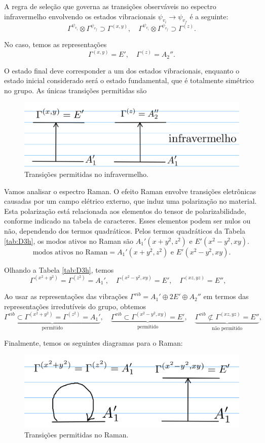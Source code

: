 \documentclass[a4paper,10pt]{article}
\begin{document}
A regra de seleção que governa as transições observáveis no espectro infravermelho envolvendo os estados vibracionais $\psi_{v_i} \to \psi_{v_f}$ é a seguinte:
$$
\Gamma^{\psi_{v_i}} \otimes \Gamma^{\psi_{v_f}} \supset \Gamma^{(x,y)}, \quad
\Gamma^{\psi_{v_i}} \otimes \Gamma^{\psi_{v_f}} \supset \Gamma^{(z)}.
$$

No caso, temos as representações
$$
\Gamma^{(x,y)} = E', \quad \Gamma^{(z)} = A_2''.
$$

O estado final deve corresponder a um dos estados vibracionais, enquanto o estado inicial considerado será o estado fundamental, que é totalmente simétrico no grupo. As únicas transições permitidas são
\begin{figure}[H]
\centering
\includegraphics[height=0.15\linewidth]{fig/infravermelho_my.png}
\caption{Transições permitidas no infravermelho.}
\label{fig:infravermelho}
\end{figure}

Vamos analisar o espectro Raman. O efeito Raman envolve transições eletrônicas causadas por um campo elétrico externo, que induz uma polarização no material. Esta polarização está relacionada aos elementos do tensor de polarizabilidade, conforme indicado na tabela de caracteres. Esses elementos podem ser nulos ou não, dependendo dos termos quadráticos. Pelos termos quadráticos da Tabela \ref{tab:D3h}, os modos ativos no Raman são $A_1' (x+y^2, z^2)$ e $E' (x^2-y^2,xy)$.
$$
\text{modos ativos no Raman} = A_1' (x+y^2, z^2) \text{ e } E' (x^2-y^2,xy).
$$

Olhando a Tabela \ref{tab:D3h}, temos
$$
\Gamma^{(x^2+y^2)} = \Gamma^{(z^2)} = A_1', \quad
\Gamma^{(x^2-y^2,xy)} = E', \quad
\Gamma^{(xz,yz)} = E'', \quad
$$

Ao usar as representações das vibrações $\Gamma^{vib} = A_1' \oplus 2 E' \oplus A_2''$ em termos das representações irredutíveis do grupo, obtemos
$$
\underbrace{\Gamma^{vib} \subset \Gamma^{(x^2+y^2)} = \Gamma^{(z^2)} = A_1'}_{\text{permitido}}, \quad
\underbrace{\Gamma^{vib} \subset \Gamma^{(x^2-y^2,xy)} = E'}_{\text{permitido}}, \quad
\underbrace{\Gamma^{vib} \not\subset \Gamma^{(xz,yz)} = E''}_{\text{não permitido}}, \quad
$$

Finalmente, temos os seguintes diagramas para o Raman:
\begin{figure}[H]
\centering
\includegraphics[height=0.15\linewidth]{fig/raman_my.png}
\caption{Transições permitidas no Raman.}
\label{fig:ramn}
\end{figure}
\end{document}
